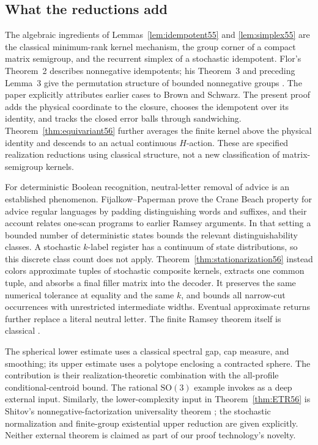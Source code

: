 \subsection{What the reductions add}
The algebraic ingredients of Lemmas~\ref{lem:idempotent55} and \ref{lem:simplex55} are the classical minimum-rank kernel mechanism, the group corner of a compact matrix semigroup, and the recurrent simplex of a stochastic idempotent. Flor's Theorem~2 describes nonnegative idempotents; his Theorem~3 and preceding Lemma~3 give the permutation structure of bounded nonnegative groups \cite{Flor}. The paper explicitly attributes earlier cases to Brown and Schwarz. The present proof adds the physical coordinate to the closure, chooses the idempotent over its identity, and tracks the closed error balls through sandwiching. Theorem~\ref{thm:equivariant56} further averages the finite kernel above the physical identity and descends to an actual continuous $H$-action. These are specified realization reductions using classical structure, not a new classification of matrix-semigroup kernels.

For deterministic Boolean recognition, neutral-letter removal of advice is an established phenomenon. Fijalkow--Paperman \cite[Theorem~10]{FP} prove the Crane Beach property for advice regular languages by padding distinguishing words and suffixes, and their account relates one-scan programs to earlier Ramsey arguments. In that setting a bounded number of deterministic states bounds the relevant distinguishability classes. A stochastic $k$-label register has a continuum of state distributions, so this discrete class count does not apply. Theorem~\ref{thm:stationarization56} instead colors approximate tuples of stochastic composite kernels, extracts one common tuple, and absorbs a final filler matrix into the decoder. It preserves the same numerical tolerance at equality and the same $k$, and bounds all narrow-cut occurrences with unrestricted intermediate widths. Eventual approximate returns further replace a literal neutral letter. The finite Ramsey theorem itself is classical \cite{Ramsey}.

The spherical lower estimate uses a classical spectral gap, cap measure, and smoothing; its upper estimate uses a polytope enclosing a contracted sphere. The contribution is their realization-theoretic combination with the all-profile conditional-centroid bound. The rational $\mathrm{SO}(3)$ example invokes \cite{BG2012} as a deep external input. Similarly, the lower-complexity input in Theorem~\ref{thm:ETR56} is Shitov's nonnegative-factorization universality theorem \cite{Shitov}; the stochastic normalization and finite-group existential upper reduction are given explicitly. Neither external theorem is claimed as part of our proof technology's novelty.


